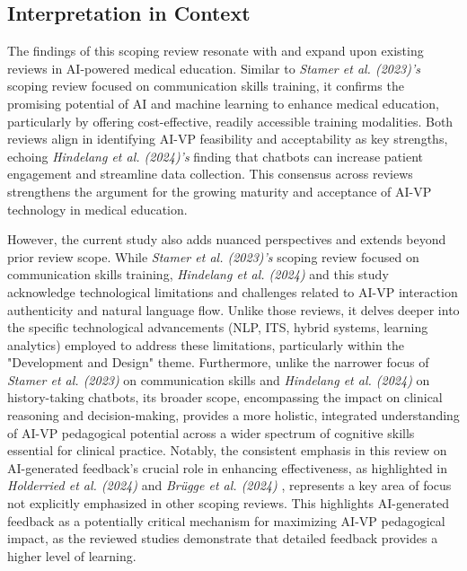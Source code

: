 \subsection*{\textbf{Interpretation in Context}}

The findings of this scoping review resonate with and expand upon existing reviews in AI-powered medical education. Similar to \textit{Stamer et al. (2023)'s} \cite{scoping2023} scoping review focused on communication skills training, it confirms the promising potential of AI and machine learning to enhance medical education, particularly by offering cost-effective, readily accessible training modalities. Both reviews align in identifying AI-VP feasibility and acceptability as key strengths, echoing \textit{Hindelang et al. (2024)'s} \cite{systematic2024} finding that chatbots can increase patient engagement and streamline data collection. This consensus across reviews strengthens the argument for the growing maturity and acceptance of AI-VP technology in medical education.

However, the current study also adds nuanced perspectives and extends beyond prior review scope. While \textit{Stamer et al. (2023)'s} scoping review focused on communication skills training, \textit{Hindelang et al. (2024)} and this study acknowledge technological limitations and challenges related to AI-VP interaction authenticity and natural language flow. Unlike those reviews, it delves deeper into the specific technological advancements (NLP, ITS, hybrid systems, learning analytics) employed to address these limitations, particularly within the "Development and Design" theme. Furthermore, unlike the narrower focus of \textit{Stamer et al. (2023)} on communication skills and \textit{Hindelang et al. (2024)} on history-taking chatbots, its broader scope, encompassing the impact on clinical reasoning and decision-making, provides a more holistic, integrated understanding of AI-VP pedagogical potential across a wider spectrum of cognitive skills essential for clinical practice. Notably, the consistent emphasis in this review on AI-generated feedback's crucial role in enhancing effectiveness, as highlighted in \textit{Holderried et al. (2024)} \cite{holderried_language_2024} and \textit{Brügge et al. (2024)} \cite{brugge_large_2024}, represents a key area of focus not explicitly emphasized in other scoping reviews. This highlights AI-generated feedback as a potentially critical mechanism for maximizing AI-VP pedagogical impact, as the reviewed studies demonstrate that detailed feedback provides a higher level of learning.

